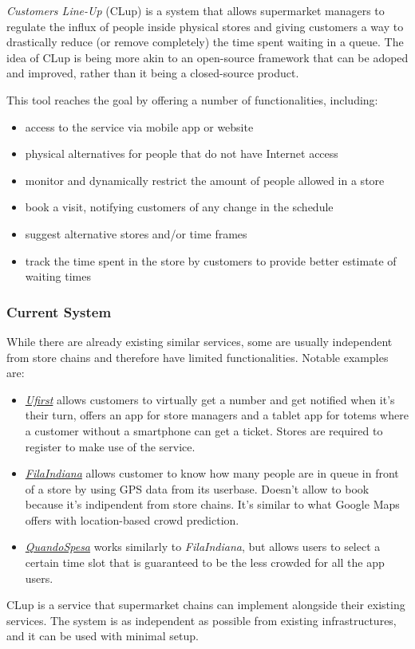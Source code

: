 \emph{Customers Line-Up} (CLup) is a system that allows supermarket managers to regulate the influx of people
inside physical stores and giving customers a way to drastically reduce (or remove completely) the time spent
waiting in a queue. The idea of CLup is being more akin to an open-source framework that can be adoped and improved, rather
than it being a closed-source product.

This tool reaches the goal by offering a number of functionalities, including:
\begin{itemize}
    \item access to the service via mobile app or website
    \item physical alternatives for people that do not have Internet access
    \item monitor and dynamically restrict the amount of people allowed in a store
    \item book a visit, notifying customers of any change in the schedule
    \item suggest alternative stores and/or time frames
    \item track the time spent in the store by customers to provide better estimate of waiting times
\end{itemize}



\subsubsection{Current System}
While there are already existing similar services, some are usually independent from store chains and
therefore have limited functionalities.
Notable examples are:
\begin{itemize}
    \item \href{https://www.ufirst.com}{\emph{Ufirst}} allows customers to virtually get a number
        and get notified when it's their turn, offers an app for store managers and a tablet app for totems
        where a customer without a smartphone can get a ticket. Stores are required to register to make use
        of the service.
    \item \href{https://play.google.com/store/apps/details?id=com.codaliscia}{\emph{FilaIndiana}} allows customer to
        know how many people are in queue in front of a store by using GPS data from its userbase. Doesn't allow to
        book because it's indipendent from store chains. It's similar to what Google Maps offers with location-based
        crowd prediction.
    \item \href{https://play.google.com/store/apps/details?id=it.anybot.quandospesa}{\emph{QuandoSpesa}} works similarly
        to \emph{FilaIndiana}, but allows users to select a certain time slot that is guaranteed to be the less crowded
        for all the app users.
    
\end{itemize} 
CLup is a service that supermarket chains can implement alongside their existing services. The system is as independent as possible from existing infrastructures, and it can be used with minimal setup.

